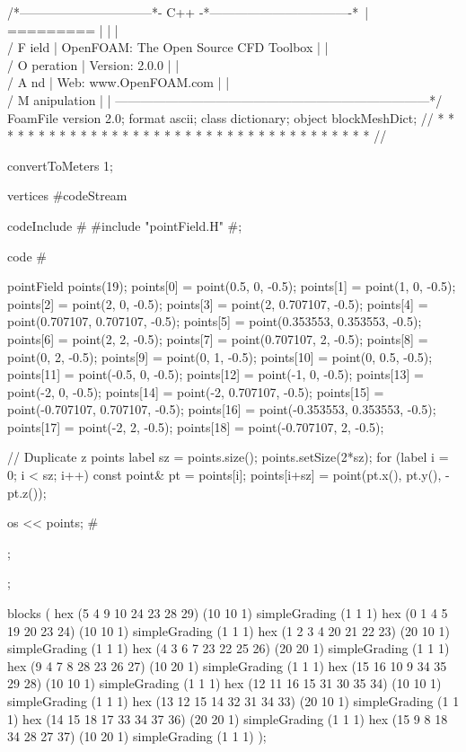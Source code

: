\begin{OFverbatim}
/*--------------------------------*- C++ -*----------------------------------*\
| =========                 |                                                 |
| \\      /  F ield         | OpenFOAM: The Open Source CFD Toolbox           |
|  \\    /   O peration     | Version:  2.0.0                                 |
|   \\  /    A nd           | Web:      www.OpenFOAM.com                      |
|    \\/     M anipulation  |                                                 |
\*---------------------------------------------------------------------------*/
FoamFile
{
    version     2.0;
    format      ascii;
    class       dictionary;
    object      blockMeshDict;
}
// * * * * * * * * * * * * * * * * * * * * * * * * * * * * * * * * * * * * * //

convertToMeters 1;

vertices #codeStream
{
    codeInclude
    #{
        #include "pointField.H"
    #};

    code
    #{
        pointField points(19);
        points[0]  = point(0.5, 0, -0.5);
        points[1]  = point(1, 0, -0.5);
        points[2]  = point(2, 0, -0.5);
        points[3]  = point(2, 0.707107, -0.5);
        points[4]  = point(0.707107, 0.707107, -0.5);
        points[5]  = point(0.353553, 0.353553, -0.5);
        points[6]  = point(2, 2, -0.5);
        points[7]  = point(0.707107, 2, -0.5);
        points[8]  = point(0, 2, -0.5);
        points[9]  = point(0, 1, -0.5);
        points[10] = point(0, 0.5, -0.5);
        points[11] = point(-0.5, 0, -0.5);
        points[12] = point(-1, 0, -0.5);
        points[13] = point(-2, 0, -0.5);
        points[14] = point(-2, 0.707107, -0.5);
        points[15] = point(-0.707107, 0.707107, -0.5);
        points[16] = point(-0.353553, 0.353553, -0.5);
        points[17] = point(-2, 2, -0.5);
        points[18] = point(-0.707107, 2, -0.5);

        // Duplicate z points
        label sz = points.size();
        points.setSize(2*sz);
        for (label i = 0; i < sz; i++)
        {
            const point& pt = points[i];
            points[i+sz] = point(pt.x(), pt.y(), -pt.z());
        }

        os  << points;
    #};
};


blocks          
(
    hex (5 4 9 10 24 23 28 29) (10 10 1) simpleGrading (1 1 1)
    hex (0 1 4 5 19 20 23 24) (10 10 1) simpleGrading (1 1 1)
    hex (1 2 3 4 20 21 22 23) (20 10 1) simpleGrading (1 1 1)
    hex (4 3 6 7 23 22 25 26) (20 20 1) simpleGrading (1 1 1)
    hex (9 4 7 8 28 23 26 27) (10 20 1) simpleGrading (1 1 1)
    hex (15 16 10 9 34 35 29 28) (10 10 1) simpleGrading (1 1 1)
    hex (12 11 16 15 31 30 35 34) (10 10 1) simpleGrading (1 1 1)
    hex (13 12 15 14 32 31 34 33) (20 10 1) simpleGrading (1 1 1)
    hex (14 15 18 17 33 34 37 36) (20 20 1) simpleGrading (1 1 1)
    hex (15 9 8 18 34 28 27 37) (10 20 1) simpleGrading (1 1 1)
);


\end{OFverbatim}

